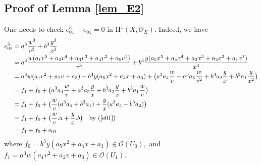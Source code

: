 \documentclass[12pt,a4]{amsart}
\theoremstyle{definition}
\begin{document}
\begin{appendix}
\subsection{Proof of Lemma \ref{lem_E2}}\label{proof_2}
One needs to check 
$e_{01}^3-e_{01} = 0$
 in $\mathrm{H}^1(X,\mathcal{O}_X).$ 
Indeed, we have
\begin{align*}
	e_{01}^3 &  = a^3\frac{w^3}{v^3} + b^3\frac{y^3}{x^3} \\
	& =  a^3\frac{w(a_1v^5+a_2v^4+a_3v^3+a_4v^2+a_5v^1)}{v^3} + b^3\frac{y(a_5x^5+a_4x^4+a_3x^3+a_2x^2+a_1x^1)}{x^3} \\
	& = a^3w(a_1v^2+a_2v+a_3) +b^3y(a_5x^2+a_4x+a_3) + \big(a^3a_4\frac{w}{v} + a^3a_5\frac{w}{v^2} + b^3a_2\frac{y}{x} + b^3a_1\frac{y}{x^2} \big) \\ 
	& = f_1+f_0 + \big(a^3a_4\frac{w}{v} + a^3a_5\frac{y}{x} + b^3a_2\frac{y}{x} + b^3a_1\frac{w}{v} \big) \\
	& = f_1+f_0 + \big(\frac{w}{v}(a^3a_4+b^3a_1) +\frac{y}{x}(a^3a_5+b^3a_2) \big) \\
	& = f_1+f_0 + \big(\frac{w}{v}.a +\frac{y}{x}.b \big) \quad \text{by (\ref{e01})} \\
	& = f_1 + f_0 + e_{01}
	\end{align*} where $f_0 = b^3y(a_5x^2+a_4x+a_3) \in \mathcal{O}(U_0),$ and $f_1 = a^3w(a_1v^2+a_2v+a_3) \in \mathcal{O}(U_1).$ 
 

\end{appendix}
\end{document}
